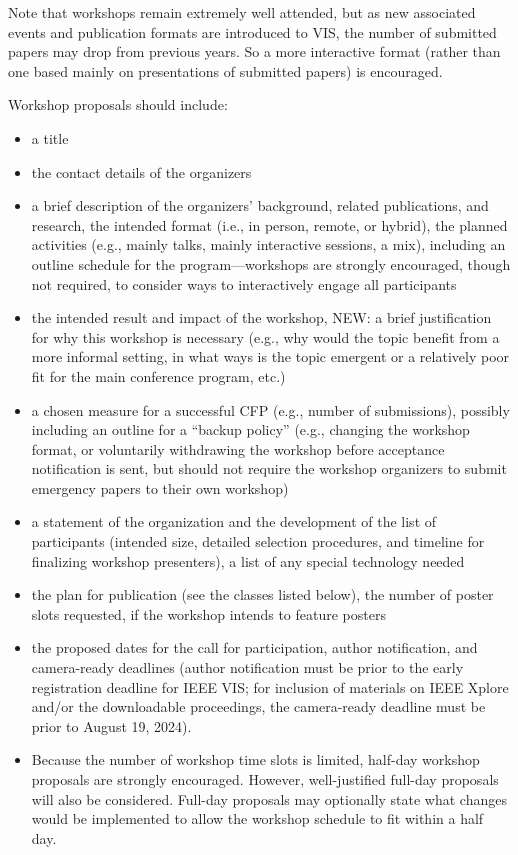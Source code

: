 Note that workshops remain extremely well attended, but as new associated events and publication formats are introduced to VIS, the number of submitted papers may drop from previous years. So a more interactive format (rather than one based mainly on presentations of submitted papers) is encouraged.

Workshop proposals should include:

\begin{itemize}
\item a title

\item the contact details of the organizers

\item a brief description of the organizers’ background, related publications, and research,
the intended format (i.e., in person, remote, or hybrid),
the planned activities (e.g., mainly talks, mainly interactive sessions, a mix), including an outline schedule for the program—workshops are strongly encouraged, though not required, to consider ways to interactively engage all participants

\item the intended result and impact of the workshop,
NEW: a brief justification for why this workshop is necessary (e.g., why would the topic benefit from a more informal setting, in what ways is the topic emergent or a relatively poor fit for the main conference program, etc.)

\item a chosen measure for a successful CFP (e.g., number of submissions), possibly including an outline for a “backup policy” (e.g., changing the workshop format, or voluntarily withdrawing the workshop before acceptance notification is sent, but should not require the workshop organizers to submit emergency papers to their own workshop)

\item a statement of the organization and the development of the list of participants (intended size, detailed selection procedures, and timeline for finalizing workshop presenters),
a list of any special technology needed

\item the plan for publication (see the classes listed below),
the number of poster slots requested, if the workshop intends to feature posters 

\item the proposed dates for the call for participation, author notification, and camera-ready deadlines (author notification must be prior to the early registration deadline for IEEE VIS; for inclusion of materials on IEEE Xplore and/or the downloadable proceedings, the camera-ready deadline must be prior to August 19, 2024).

\item Because the number of workshop time slots is limited, half-day workshop proposals are strongly encouraged. However, well-justified full-day proposals will also be considered. Full-day proposals may optionally state what changes would be implemented to allow the workshop schedule to fit within a half day.

\end{itemize}
